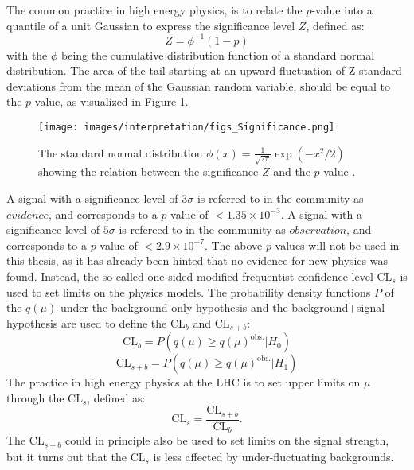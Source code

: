 The common practice in high energy physics, is to relate the $p$-value into a quantile of a unit Gaussian to express the significance level $Z$, defined as:
\begin{equation}
Z=\phi^{-1}(1-p)
\end{equation}
with the $\phi$ being the cumulative distribution function of a standard normal distribution. 
The area of the tail starting at an upward fluctuation of Z standard deviations from the mean of the Gaussian random variable, should be equal to the $p$-value, as visualized in Figure \ref{fig:pvalue}.
\begin{figure}[!hbtp]
\centering
\texttt{[image: images/interpretation/figs\_Significance.png]}
\caption{The standard normal distribution $\phi(x)=\frac{1}{\sqrt{2\pi}}\exp(-x^{2}/2)$ showing the relation between the significance $Z$ and the $p$-value \cite{Cowan:2010js}.}
\label{fig:pvalue}
\end{figure}
A signal with a significance level of $3\sigma$ is referred to in the community as $evidence$, and corresponds to a $p$-value of $<1.35\times10^{-3}$. 
A signal with a significance level of $5\sigma$ is refereed to in the community as $observation$, and corresponds to a $p$-value of $<2.9\times10^{-7}$. 
The above $p$-values will not be used in this thesis, as it has already been hinted that no evidence for new physics was found. 
Instead, the so-called one-sided modified frequentist confidence level $\mathrm{CL}_{s}$ is used to set limits on the physics models.                                                                 
The probability density functions $P$ of the $q(\mu)$ under the background only hypothesis and the background+signal hypothesis are used to define the $\mathrm{CL}_{b}$ and $\mathrm{CL}_{s+b}$:
\begin{equation}
\mathrm{CL}_{b}=P(q(\mu)\geq q(\mu)^{\mathrm{obs.}}|H_{0})
\end{equation} 
\begin{equation}
\mathrm{CL}_{s+b}=P(q(\mu)\geq q(\mu)^{\mathrm{obs.}}|H_{1})
\end{equation} 
The practice in high energy physics at the LHC is to set upper limits on $\mu$ through the $\mathrm{CL}_{s}$, defined as:
\begin{equation}
\mathrm{CL}_{s}=\frac{\mathrm{CL}_{s+b}}{\mathrm{CL}_{b}}.
\end{equation} 
The $\mathrm{CL}_{s+b}$ could in principle also be used to set limits on the signal strength, but it turns out that the $\mathrm{CL}_{s}$ is less affected by under-fluctuating backgrounds. 
